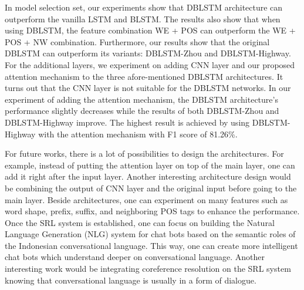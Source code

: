 
In model selection set, our experiments show that DBLSTM architecture can outperform the vanilla LSTM and BLSTM. The results also show that when using DBLSTM, the feature combination WE + POS can outperform the WE + POS + NW combination. Furthermore, our results show that the original DBLSTM can outperform its variants: DBLSTM-Zhou and DBLSTM-Highway. For the additional layers, we experiment on adding CNN layer and our proposed attention mechanism to the three afore-mentioned DBLSTM architectures. It turns out that the CNN layer is not suitable for the DBLSTM networks. In our experiment of adding the attention mechanism, the DBLSTM architecture's performance slightly decreases while the results of both DBLSTM-Zhou and DBLSTM-Highway improve. The highest result is achieved by using DBLSTM-Highway with the attention mechanism with F1 score of 81.26\%.

For future works, there is a lot of possibilities to design the architectures. For example, instead of putting the attention layer on top of the main layer, one can add it right after the input layer. Another interesting architecture design would be combining the output of CNN layer and the original input before going to the main layer. Beside architectures, one can experiment on many features such as word shape, prefix, suffix, and neighboring POS tags to enhance the performance. Once the SRL system is established, one can focus on building the Natural Language Generation (NLG) system for chat bots based on the semantic roles of the Indonesian conversational language. This way, one can create more intelligent chat bots which understand deeper on conversational language. Another interesting work would be integrating coreference resolution on the SRL system knowing that conversational language is usually in a form of dialogue.




